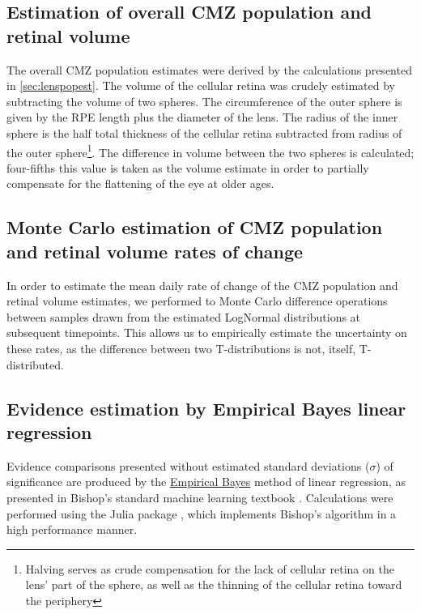 \subsection{Estimation of overall CMZ population and retinal volume}
The overall CMZ population estimates were derived by the calculations presented in \autoref{sec:lenspopest}. The volume of the cellular retina was crudely estimated by subtracting the volume of two spheres. The circumference of the outer sphere is given by the RPE length plus the diameter of the lens. The radius of the inner sphere is the half total thickness of the cellular retina subtracted from radius of the outer sphere\footnote{Halving serves as crude compensation for the lack of cellular retina on the lens' part of the sphere, as well as the thinning of the cellular retina toward the periphery}. The difference in volume between the two spheres is calculated; four-fifths this value is taken as the volume estimate in order to partially compensate for the flattening of the eye at older ages.

\subsection{Monte Carlo estimation of CMZ population and retinal volume rates of change}
In order to estimate the mean daily rate of change of the CMZ population and retinal volume estimates, we performed to Monte Carlo difference operations between samples drawn from the estimated LogNormal distributions at subsequent timepoints. This allows us to empirically estimate the uncertainty on these rates, as the difference between two T-distributions is not, itself, T-distributed.


\subsection{Evidence estimation by Empirical Bayes linear regression}
Evidence comparisons presented without estimated standard deviations ($\sigma$) of significance are produced by the \hyperref[ssec:EmpiricalBayes]{Empirical Bayes} method of linear regression, as presented in Bishop's standard machine learning textbook \cite{Bishop2006}. Calculations were performed using the Julia package , which implements Bishop's algorithm in a high performance manner. 




